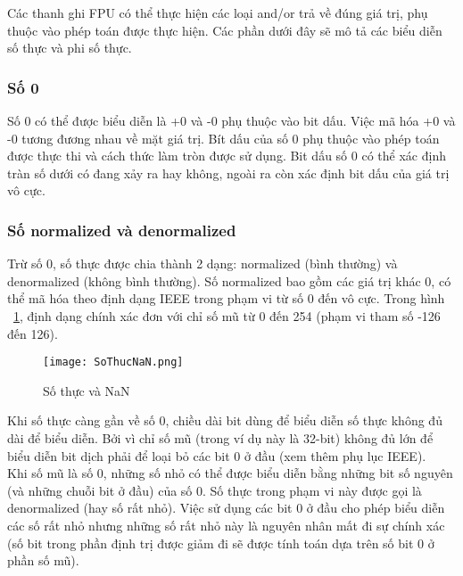 		Các thanh ghi FPU có thể thực hiện các loại and/or trả về đúng giá trị, phụ thuộc vào phép toán được thực hiện. Các phần dưới đây sẽ mô tả các biểu diễn số thực và phi số thực.
		
		\subsubsection*{Số 0}
		Số 0 có thể được biểu diễn là +0 và  -0 phụ thuộc vào bit dấu. Việc mã hóa +0 và -0 tương đương nhau về mặt giá trị. Bít dấu của số 0 phụ thuộc vào phép toán được thực thi và cách thức làm tròn được sử dụng. Bit dấu số 0 có thể xác định tràn số dưới có đang xảy ra hay không, ngoài ra còn xác định bit dấu của giá trị vô cực. 
		
		\newpage
		\subsubsection*{Số normalized và denormalized}
		Trừ số 0, số thực được chia thành 2 dạng: normalized (bình thường) và denormalized (không bình thường). Số normalized bao gồm các giá trị khác 0, có thể mã hóa theo định dạng IEEE trong phạm vi từ số 0 đến vô cực. Trong hình ~\ref{fig:SothucNaN}, định dạng chính xác đơn với chỉ số mũ từ 0 đến 254 (phạm vi tham số -126 đến 126).
		\begin{center}
			\begin{figure}[htp]
				\begin{center}
					\texttt{[image: SoThucNaN.png]}
				\end{center}
				\caption{Số thực và NaN}				
				\label{fig:SothucNaN}
			\end{figure}
		\end{center}	

	Khi số thực càng gần về số 0, chiều dài bit dùng để biểu diễn số thực không đủ dài để biểu diễn. Bởi vì chỉ số mũ (trong ví dụ này là 32-bit) không đủ lớn để biểu diễn bit dịch phải để loại bỏ các bit 0 ở đầu (xem thêm phụ lục IEEE).\\

	Khi số mũ là số 0, những số nhỏ có thể được biểu diễn bằng những bit số nguyên (và những chuỗi bit ở đầu) của số 0. Số thực trong phạm vi này được gọi là denormalized (hay số rất nhỏ). Việc sử dụng các bit 0 ở đầu cho phép biểu diễn các số rất nhỏ nhưng những số rất nhỏ này là nguyên nhân mất đi sự chính xác (số bit trong phần định trị được giảm đi sẽ được tính toán dựa trên số bit 0 ở phần số mũ).\\

